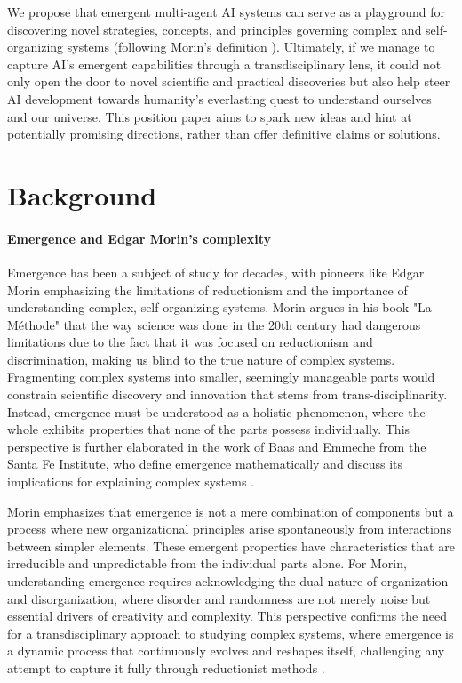 \documentclass[11pt]{article}
\begin{document}
We propose that emergent multi-agent AI systems can serve as a playground for discovering novel strategies, concepts, and principles governing complex and self-organizing systems (following Morin's definition \cite{morin}). Ultimately, if we manage to capture AI's emergent capabilities through a transdisciplinary lens, it could not only open the door to novel scientific and practical discoveries but also help steer AI development towards humanity's everlasting quest to understand ourselves and our universe.
This position paper aims to spark new ideas and hint at potentially promising directions, rather than offer definitive claims or solutions.

\section{Background}

\paragraph{Emergence and Edgar Morin's complexity}Emergence has been a subject of study for decades, with pioneers like Edgar Morin emphasizing the limitations of reductionism and the importance of understanding complex, self-organizing systems. Morin argues in his book "La Méthode"\cite{morin} that the way science was done in the 20th century had dangerous limitations due to the fact that it was focused on reductionism and discrimination, making us blind to the true nature of complex systems. Fragmenting complex systems into smaller, seemingly manageable parts would constrain scientific discovery and innovation that stems from trans-disciplinarity. Instead, emergence must be understood as a holistic phenomenon, where the whole exhibits properties that none of the parts possess individually. This perspective is further elaborated in the work of Baas and Emmeche from the Santa Fe Institute, who define emergence mathematically and discuss its implications for explaining complex systems \cite{baas_emmeche}.

Morin emphasizes that emergence is not a mere combination of components but a process where new organizational principles arise spontaneously from interactions between simpler elements. These emergent properties have characteristics that are irreducible and unpredictable from the individual parts alone. For Morin, understanding emergence requires acknowledging the dual nature of organization and disorganization, where disorder and randomness are not merely noise but essential drivers of creativity and complexity. This perspective confirms the need for a transdisciplinary approach to studying complex systems, where emergence is a dynamic process that continuously evolves and reshapes itself, challenging any attempt to capture it fully through reductionist methods \cite{morin}.
\end{document}

